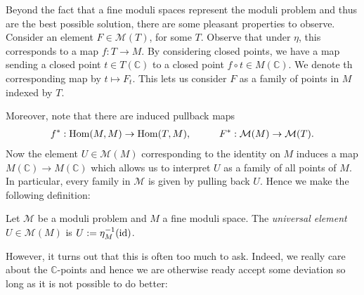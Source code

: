\documentclass[12pt]{ociamthesis}  %
\begin{document}
Beyond the fact that a fine moduli spaces represent the moduli
problem and thus are the best possible solution, there are some
pleasant properties to observe.
Consider an element $F\in\mathcal M(T)$, for some $T$. Observe that
under $\eta$, this corresponds to a map $f:T\to M$. By considering
closed points, we have a map sending a closed point $t\in T(\mathbb C)$
to a closed point $f\circ t\in M(\mathbb C)$. We denote th corresponding
map by $t \mapsto F_t$. This lets us consider $F$ as a family of
points in $M$ indexed by $T$.

Moreover, note that there are induced
pullback maps
\begin{align*}
  f^* : \operatorname{Hom}(M,M)\to\operatorname{Hom}(T,M), \hspace{1cm}
  F^* : \mathcal M(M)\to \mathcal M(T).
\end{align*}
Now the element $U\in\mathcal M(M)$ corresponding to the identity on $M$
induces a map $M(\mathbb C)\to M(\mathbb C)$ which allows us to
interpret $U$ as a family of all points of $M$. In particular,
every family in $\mathcal M$ is given by pulling back $U$.
Hence we make the following definition:

\begin{definition}
  Let $\mathcal M$ be a moduli problem and $M$ a fine moduli space.
  The \emph{universal element} $U\in\mathcal M(M)$ is
  $U:=\eta^{-1}_M (\operatorname{id})$.
\end{definition}

\begin{example}
  \missingexample
\end{example}

However, it turns out that this is often too much to ask. Indeed,
we really care about the $\mathbb{C}$-points and hence
we are otherwise ready accept some deviation so long as it is not
possible to do better:
\end{document}
